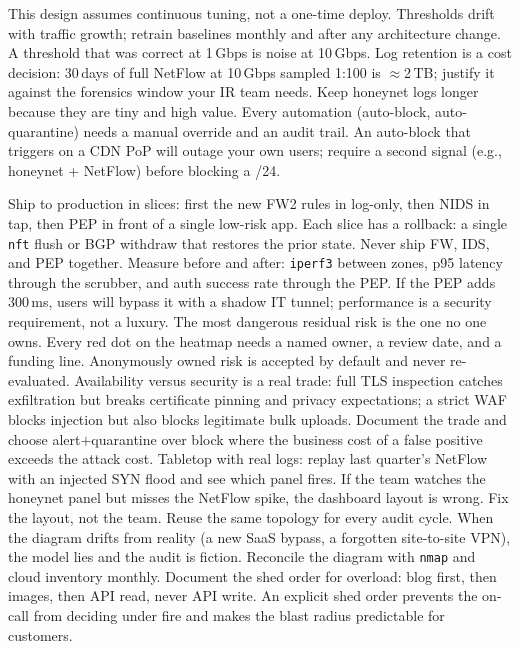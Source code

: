 \begin{remark}\label{rem:opnote}
This design assumes continuous tuning, not a one-time deploy. Thresholds drift with traffic growth; retrain baselines monthly and after any architecture change. A threshold that was correct at 1\,Gbps is noise at 10\,Gbps.
Log retention is a cost decision: 30\,days of full NetFlow at 10\,Gbps sampled 1:100 is $\approx$2\,TB; justify it against the forensics window your IR team needs. Keep honeynet logs longer because they are tiny and high value.
Every automation (auto-block, auto-quarantine) needs a manual override and an audit trail. An auto-block that triggers on a CDN PoP will outage your own users; require a second signal (e.g., honeynet + NetFlow) before blocking a /24.
\end{remark}
Ship to production in slices: first the new FW2 rules in log-only, then NIDS in tap, then PEP in front of a single low-risk app. Each slice has a rollback: a single \texttt{nft} flush or BGP withdraw that restores the prior state. Never ship FW, IDS, and PEP together.
Measure before and after: \texttt{iperf3} between zones, p95 latency through the scrubber, and auth success rate through the PEP. If the PEP adds 300\,ms, users will bypass it with a shadow IT tunnel; performance is a security requirement, not a luxury.
The most dangerous residual risk is the one no one owns. Every red dot on the heatmap needs a named owner, a review date, and a funding line. Anonymously owned risk is accepted by default and never re-evaluated.
Availability versus security is a real trade: full TLS inspection catches exfiltration but breaks certificate pinning and privacy expectations; a strict WAF blocks injection but also blocks legitimate bulk uploads. Document the trade and choose alert$+$quarantine over block where the business cost of a false positive exceeds the attack cost.
Tabletop with real logs: replay last quarter's NetFlow with an injected SYN flood and see which panel fires. If the team watches the honeynet panel but misses the NetFlow spike, the dashboard layout is wrong. Fix the layout, not the team.
Reuse the same topology for every audit cycle. When the diagram drifts from reality (a new SaaS bypass, a forgotten site-to-site VPN), the model lies and the audit is fiction. Reconcile the diagram with \texttt{nmap} and cloud inventory monthly.
Document the shed order for overload: blog first, then images, then API read, never API write. An explicit shed order prevents the on-call from deciding under fire and makes the blast radius predictable for customers.
